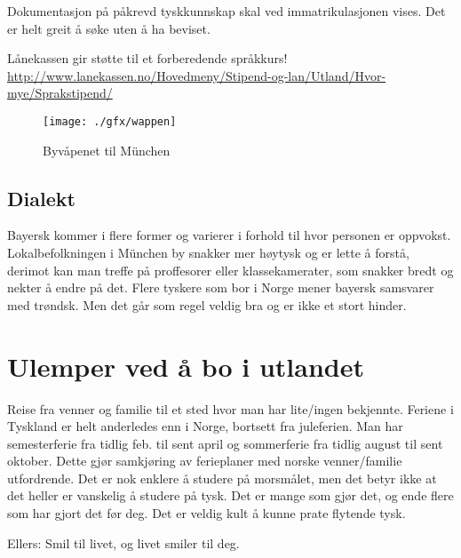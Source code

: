 Dokumentasjon på påkrevd tyskkunnskap skal ved immatrikulasjonen vises. Det er helt greit å søke uten å ha beviset.

Lånekassen gir støtte til et forberedende språkkurs! \\
\url{http://www.lanekassen.no/Hovedmeny/Stipend-og-lan/Utland/Hvor-mye/Sprakstipend/}

\begin{figure}[h]
\center
\texttt{[image: ./gfx/wappen]}
\caption{Byvåpenet til München}
\end{figure}

\subsection{Dialekt}
Bayersk kommer i flere former og varierer i forhold til hvor personen er oppvokst. Lokalbefolkningen i München by snakker mer høytysk og er lette å forstå, derimot kan man treffe på proffesorer eller klassekamerater, som snakker bredt og nekter å endre på det. Flere tyskere som bor i Norge mener bayersk samsvarer med trøndsk. 
Men det går som regel veldig bra og er ikke et stort hinder.




\section{Ulemper ved å bo i utlandet}

Reise fra venner og familie til et sted hvor man har lite/ingen bekjennte. Feriene i Tyskland er helt anderledes enn i Norge, bortsett fra juleferien. Man har semesterferie fra tidlig feb. til sent april og sommerferie fra tidlig august til sent oktober. Dette gjør samkjøring av ferieplaner med norske venner/familie utfordrende. Det er nok enklere å studere på morsmålet, men det betyr ikke at det heller er vanskelig å studere på tysk. Det er mange som gjør det, og ende flere som har gjort det før deg. Det er veldig kult å kunne prate flytende tysk.

Ellers: Smil til livet, og livet smiler til deg.
